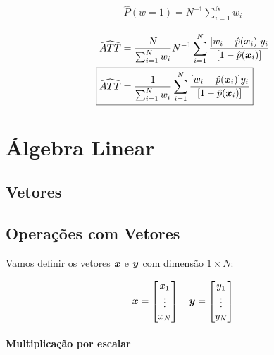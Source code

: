 \documentclass[11pt, oneside, a4paper, article]{article}
\numberwithin{equation}{section}
\begin{document}
\begin{description}
\vspace{-1 em}
\begin{align*}
	\hat{P} (w = 1) = N^{-1} \sum_{i=1}^{N} w_{i}
\end{align*}

\vspace{-1.5 em}
\begin{align*}
	\widehat{ATT} &=
	\frac{N}{\sum_{i=1}^{N} w_{i} }
	N^{-1} \sum_{i=1}^{N}
	\frac{[ w_{i} - \hat{p}(\xvec_{i} ) ] y_{i} }{[ 1 - \hat{p}( \xvec_{i} ) ]}
	\\
	\Aboxed{
		\widehat{ATT} &=
		\frac{1}{\sum_{i=1}^{N} w_{i} }
		\sum_{i=1}^{N}
		\frac{[ w_{i} - \hat{p}(\xvec_{i} ) ] y_{i} }{[1 - \hat{p}( \xvec_{i} ) ]}
	}
\end{align*}

\clearpage
\section{Álgebra Linear}

\subsection{Vetores}


\subsection{Operações com Vetores}

Vamos definir os vetores $\boldsymbol{x}$ e $\boldsymbol{y}$ com dimensão $1 \times N$:

\begin{align*}
	\boldsymbol{x} = 
	\begin{bmatrix}
		x_{1} \\ \vdots \\ x_{N}	
	\end{bmatrix}
	\quad
	\boldsymbol{y} = 
	\begin{bmatrix}
		y_{1} \\ \vdots \\ y_{N}	
	\end{bmatrix}
\end{align*}

\paragraph{Multiplicação por escalar}


\end{description}
\end{document}

